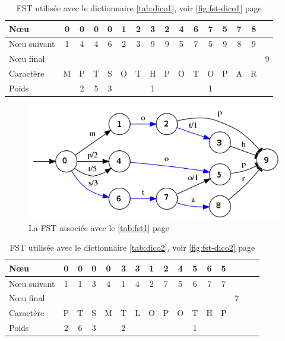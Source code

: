 \begin{table}[ht]
    \centering
    \begin{tabular}{|l||c|c|c|c|c|c|c|c|c|c|c|c|c|c|c|}
        \hline
        N\oe u & 0 & 0 & 0 & 0 & 1 & 2 & 3 & 2 & 4 & 6 & 7 & 5 & 7 & 8 & \\ \hline
        N\oe u suivant & 1 & 4 & 4 & 6 & 2 & 3 & 9 & 9 & 5 & 7 & 5 & 9 & 8 & 9 & \\ \hline
        N\oe u final &&&&&&&&&&&&&&& 9 \\ \hline
        Caractère & M & P & T & S& O & T & H & P & O & T & O & P & A & R & \\ \hline
        Poids & & 2 & 5 & 3 &&& 1 &&&&1&&&& \\ \hline
    \end{tabular}
    \caption{FST utilisée avec le dictionnaire \autoref{tab:dico1}, voir \autoref{fig:fst-dico1} page \pageref{fig:fst-dico1}}
    \label{tab:fst1}
\end{table}

\begin{figure}[ht]
    \centering
    \includegraphics[scale=0.5]{../c_asm/1.png}
    \caption{La FST associée avec le \autoref{tab:fst1} page \pageref{tab:fst1}}
    \label{fig:fst-dico1}
\end{figure}

\begin{table}[ht]
    \centering
    \begin{tabular}{|l||c|c|c|c|c|c|c|c|c|c|c|c|c|c|c|}
        \hline
        N\oe u & 0 & 0 & 0 & 0 & 3 & 3 & 1 & 2 & 4 & 5 & 6 & 5 &\\ \hline
        N\oe u suivant & 1 & 1 & 3 & 4 & 1 & 4 & 2 & 7 & 5 & 6 & 7 & 7 &\\ \hline
        N\oe u final &&&&&&&&&&&&& 7 \\ \hline
        Caractère & P & T & S & M& T & L & O & P & O & T & H & P & \\ \hline
        Poids & 2 & 6 & 3 &  & 2 & & & & & 1 &&& \\ \hline
    \end{tabular}
    \caption{FST utilisée avec le dictionnaire \autoref{tab:dico2}, voir \autoref{fig:fst-dico2} page \pageref{fig:fst-dico2}}
    \label{tab:fst2}
\end{table}

